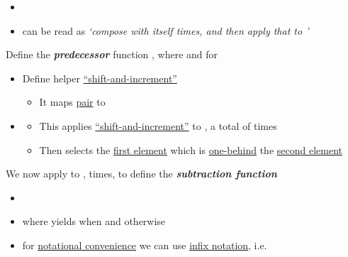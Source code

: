 \begin{itemize}
\tightlist
\item
\item
  can be read as \textit{`compose  with itself 
  times, and then apply that to '}
\end{itemize}

Define the \textbf{\textit{predecessor}} function ,
where  and 
for 

\begin{itemize}
\tightlist
\item
  Define helper \ul{``shift-and-increment''}

  \begin{itemize}
  \tightlist
  \item
    It maps \ul{pair}  to
  \end{itemize}
\item

  \begin{itemize}
  \tightlist
  \item
    This applies \ul{``shift-and-increment''} to
    , a total of  times
  \item
    Then selects the \ul{first element} which is \ul{one-behind} the
    \ul{second element}
  \end{itemize}
\end{itemize}

We now apply  to ,  times, to
define the \textbf{\textit{subtraction function}}

\begin{itemize}
\tightlist
\item
\item
  where  yields  when  and
   otherwise
\item
  for \ul{notational convenience} we can use \ul{infix notation},
  i.e.~
\end{itemize}

